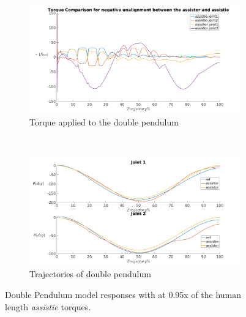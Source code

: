 \begin{figure}[h!]
    \centering
    \begin{subfigure}{0.5\textwidth}
        \centering
        \includegraphics[width=\linewidth]{images/controllers/small_length_torque.png}
        \caption[Double Pendulum: Negative Alignment-Effort]{Torque applied to the double pendulum}
        \label{fig:small_length_torque}
    \end{subfigure}%
    ~
    \begin{subfigure}{0.5\textwidth}
        \centering
        \includegraphics[width=\linewidth]{images/controllers/small_length_traj.png}
        \caption[Double Pendulum: Negative Alignment-Trajectory]{Trajectories of double pendulum}
        \label{fig:small_length_traj}
    \end{subfigure}
    \caption[Double Pendulum: Negative Alignment]{Double Pendulum model responses with at 0.95x of the human length \textit{assistie} torques.}
    \label{fig:small_length}
\end{figure}

